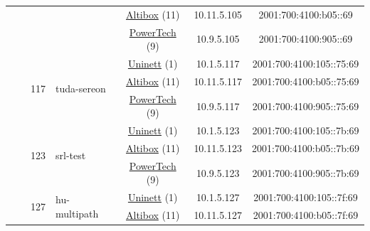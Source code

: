 \begin{small}
\begin{center}
\begin{longtable}{|c|c|c|c|c|c|c|c|}
  &  & \multicolumn{2}{|c|}{} & \multicolumn{2}{|c|}{\tiny{\href{https://www.altibox.no}{Altibox} (11)}} & \tiny{10.11.5.105} & \tiny{2001:700:4100:b05::69} \\* \cline{5-5}\cline{6-6}\cline{7-7}\cline{8-8}
  &  & \multicolumn{2}{|c|}{} & \multicolumn{2}{|c|}{\tiny{\href{http://www.powertech.no}{PowerTech} (9)}} & \tiny{10.9.5.105} & \tiny{2001:700:4100:905::69} \\* \cline{3-3}\cline{4-4}\cline{5-5}\cline{6-6}\cline{7-7}\cline{8-8}
  &  & \multirow{3}{*}{\tiny{117}} & \multicolumn{1}{|l|}{\multirow{3}{*}{\tiny{tuda-sereon}}} & \multicolumn{2}{|c|}{\tiny{\href{https://www.uninett.no}{Uninett} (1)}} & \tiny{10.1.5.117} & \tiny{2001:700:4100:105::75:69} \\* \cline{5-5}\cline{6-6}\cline{7-7}\cline{8-8}
  &  &  &  & \multicolumn{2}{|c|}{\tiny{\href{https://www.altibox.no}{Altibox} (11)}} & \tiny{10.11.5.117} & \tiny{2001:700:4100:b05::75:69} \\* \cline{5-5}\cline{6-6}\cline{7-7}\cline{8-8}
  &  &  &  & \multicolumn{2}{|c|}{\tiny{\href{http://www.powertech.no}{PowerTech} (9)}} & \tiny{10.9.5.117} & \tiny{2001:700:4100:905::75:69} \\* \cline{3-3}\cline{4-4}\cline{5-5}\cline{6-6}\cline{7-7}\cline{8-8}
  &  & \multirow{3}{*}{\tiny{123}} & \multicolumn{1}{|l|}{\multirow{3}{*}{\tiny{srl-test}}} & \multicolumn{2}{|c|}{\tiny{\href{https://www.uninett.no}{Uninett} (1)}} & \tiny{10.1.5.123} & \tiny{2001:700:4100:105::7b:69} \\* \cline{5-5}\cline{6-6}\cline{7-7}\cline{8-8}
  &  &  &  & \multicolumn{2}{|c|}{\tiny{\href{https://www.altibox.no}{Altibox} (11)}} & \tiny{10.11.5.123} & \tiny{2001:700:4100:b05::7b:69} \\* \cline{5-5}\cline{6-6}\cline{7-7}\cline{8-8}
  &  &  &  & \multicolumn{2}{|c|}{\tiny{\href{http://www.powertech.no}{PowerTech} (9)}} & \tiny{10.9.5.123} & \tiny{2001:700:4100:905::7b:69} \\* \cline{3-3}\cline{4-4}\cline{5-5}\cline{6-6}\cline{7-7}\cline{8-8}
  &  & \multirow{3}{*}{\tiny{127}} & \multicolumn{1}{|l|}{\multirow{3}{*}{\tiny{hu-multipath}}} & \multicolumn{2}{|c|}{\tiny{\href{https://www.uninett.no}{Uninett} (1)}} & \tiny{10.1.5.127} & \tiny{2001:700:4100:105::7f:69} \\* \cline{5-5}\cline{6-6}\cline{7-7}\cline{8-8}
  &  &  &  & \multicolumn{2}{|c|}{\tiny{\href{https://www.altibox.no}{Altibox} (11)}} & \tiny{10.11.5.127} & \tiny{2001:700:4100:b05::7f:69} \\* \cline{5-5}\cline{6-6}\cline{7-7}\cline{8-8}

\end{longtable}
\end{center}
\end{small}
